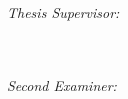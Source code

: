 \begin{titlepage}
\begin{addmargin}[-2cm]{-3cm}
\begin{center}
            \begin{minipage}[b]{0.5\textwidth}
                \centering
                \emph{Thesis Supervisor:}\\[0.1cm]
                \myProf \\
                \myProfUni \\
                \myProfLocation
            \end{minipage}%
            \begin{minipage}[b]{0.5\textwidth}
                \centering
                \emph{Second Examiner:}\\
                \myOtherProf \\
                \myOtherProfUni \\
                \myOtherProfLocation
            \end{minipage}
            \\[1.5cm]
            \vfill
            
            
            \color{CTtitle}
            {\Large \myFaculty \\[0.25cm]}
            {\Large \myDepartment}  \\[2cm] %
            
            \vfill
            
        \end{center}
    \end{addmargin}
\end{titlepage}
